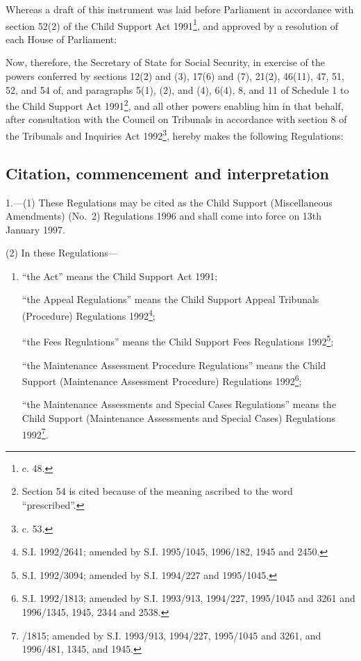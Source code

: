 \documentclass[12pt,a4paper]{article}
\title{\regstitle}
\author{S.I. 1996 No. 3196}
\date{Made 18th December 1996\\Coming into force 13th January 1997}
\begin{document}
\maketitle

\noindent
Whereas a draft of this instrument was laid before Parliament in accordance with section 52(2) of the Child Support Act 1991\footnote{ c. 48.}, and approved by a resolution of each House of Parliament:

 Now, therefore, the Secretary of State for Social Security, in exercise of the powers conferred by sections 12(2) and (3), 17(6) and (7), 21(2), 46(11), 47, 51, 52, and 54 of, and paragraphs 5(1), (2), and (4), 6(4), 8, and 11 of Schedule 1 to the Child Support Act 1991\footnote{\frenchspacing Section 54 is cited because of the meaning ascribed to the word “prescribed”.}, and all other powers enabling him in that behalf, after consultation with the Council on Tribunals in accordance with section 8 of the Tribunals and Inquiries Act 1992\footnote{ c. 53.}, hereby makes the following Regulations:



{\sloppy

\tableofcontents

}

\setcounter{secnumdepth}{-2}

\subsection[1. Citation, commencement and interpretation]{Citation, commencement and interpretation}

1.—(1) These Regulations may be cited as the Child Support (Miscellaneous Amendments) (No.\ 2) Regulations 1996 and shall come into force on 13th January 1997.

(2) In these Regulations—
\begin{enumerate}\item[]
“the Act” means the Child Support Act 1991;

“the Appeal Regulations” means the Child Support Appeal Tribunals (Procedure) Regulations 1992\footnote{\frenchspacing S.I. 1992/2641; amended by S.I. 1995/1045, 1996/182, 1945 and 2450.};

“the Fees Regulations” means the Child Support Fees Regulations 1992\footnote{\frenchspacing S.I. 1992/3094; amended by S.I. 1994/227 and 1995/1045.};

“the Maintenance Assessment Procedure Regulations” means the Child Support (Maintenance Assessment Procedure) Regulations 1992\footnote{\frenchspacing S.I. 1992/1813; amended by S.I. 1993/913, 1994/227, 1995/1045 and 3261 and 1996/1345, 1945, 2344 and 2538.};

“the Maintenance Assessments and Special Cases Regulations” means the Child Support (Maintenance Assessments and Special Cases) Regulations 1992\footnote{/1815; amended by S.I. 1993/913, 1994/227, 1995/1045 and 3261, and 1996/481, 1345, and 1945.}.
\end{enumerate}
\end{document}
